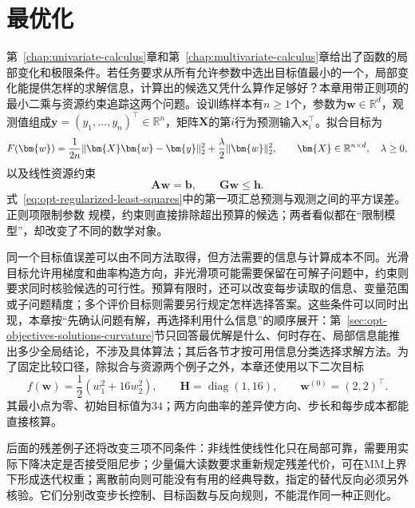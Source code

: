\chapter{最优化}
\label{chap:optimization}

第~\ref{chap:univariate-calculus}章和第~\ref{chap:multivariate-calculus}章给出了函数的局部变化和极限条件。若任务要求从所有允许参数中选出目标值最小的一个，局部变化能提供怎样的求解信息，计算出的候选又凭什么算作足够好？本章用带正则项的最小二乘与资源约束追踪这两个问题。设训练样本有$n\geq1$个，参数为$\bm w\in\mathbb R^d$，观测值组成$\bm y=(y_1,\ldots,y_n)^\top\in\mathbb R^n$，矩阵$\bm X$的第$i$行为预测输入$\bm x_i^\top$。拟合目标为
\begin{equation}
  F(\bm{w})
  =
  \frac{1}{2n}\lVert \bm{X}\bm{w}-\bm{y}\rVert_2^2
  +\frac{\lambda}{2}\lVert\bm{w}\rVert_2^2,
  \qquad
  \bm{X}\in\mathbb{R}^{n\times d},\quad \lambda\geq 0,
  \label{eq:opt-regularized-least-squares}
\begingroup
\makeatletter
\let\label\ltx@label
\label{eq:prelim-regularized-least-squares}
\endgroup
\end{equation}
以及线性资源约束
\begin{equation}
  \bm{A}\bm{w}=\bm{b},\qquad
  \bm{G}\bm{w}\leq\bm{h}.
  \label{eq:opt-linear-resource-constraints}
\end{equation}
式~\eqref{eq:opt-regularized-least-squares}中的第一项汇总预测与观测之间的平方误差。正则项限制参数
规模，约束则直接排除超出预算的候选；两者看似都在“限制模型”，却改变了不同的数学对象。

同一个目标值误差可以由不同方法取得，但方法需要的信息与计算成本不同。光滑目标允许用梯度和曲率构造方向，非光滑项可能需要保留在可解子问题中，约束则要求同时核验候选的可行性。预算有限时，还可以改变每步读取的信息、变量范围或子问题精度；多个评价目标则需要另行规定怎样选择答案。这些条件可以同时出现，本章按“先确认问题有解，再选择利用什么信息”的顺序展开：第~\ref{sec:opt-objectives-solutions-curvature}节只回答最优解是什么、何时存在、局部信息能推出多少全局结论，不涉及具体算法；其后各节才按可用信息分类选择求解方法。为了固定比较口径，除拟合与资源两个例子之外，本章还使用以下二次目标
\begin{equation}
 f(\bm w)=\frac12(w_1^2+16w_2^2),\qquad
 \bm H=\operatorname{diag}(1,16),\qquad
 \bm w^{(0)}=(2,2)^\top.
 \label{eq:opt-common-quadratic}
\end{equation}
其最小点为零、初始目标值为$34$；两方向曲率的差异使方向、步长和每步成本都能直接核算。

后面的残差例子还将改变三项不同条件：非线性使线性化只在局部可靠，需要用实际下降决定是否接受阻尼步；少量偏大读数要求重新规定残差代价，可在MM上界下形成迭代权重；离散前向则可能没有有用的经典导数，指定的替代反向必须另外核验。它们分别改变步长控制、目标函数与反向规则，不能混作同一种正则化。

